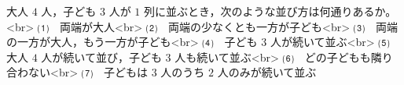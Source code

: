 大人 $4$ 人，子ども $3$ 人が $1$ 列に並ぶとき，次のような並び方は何通りあるか。<br>
⑴　両端が大人<br>
⑵　両端の少なくとも一方が子ども<br>
⑶　両端の一方が大人，もう一方が子ども<br>
⑷　子ども $3$ 人が続いて並ぶ<br>
⑸　大人 $4$ 人が続いて並び，子ども $3$ 人も続いて並ぶ<br>
⑹　どの子どもも隣り合わない<br>
⑺　子どもは $3$ 人のうち $2$ 人のみが続いて並ぶ